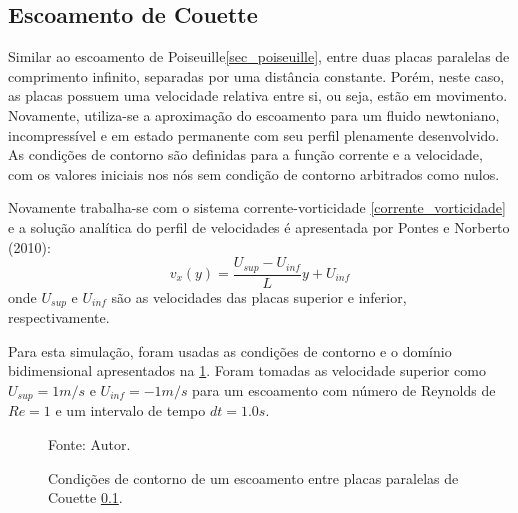 \subsection{\textbf{Escoamento de Couette}}
\label{sec_couette}
Similar ao escoamento de Poiseuille\ref{sec_poiseuille}, entre duas placas paralelas de comprimento infinito, separadas por uma distância constante.
Porém, neste caso, as placas possuem uma velocidade relativa entre si, ou seja, estão em movimento.
Novamente, utiliza-se a aproximação do escoamento para um fluido newtoniano, incompressível e em estado permanente com seu perfil plenamente desenvolvido.
As condições de contorno são definidas para a função corrente e a velocidade, com os valores iniciais nos nós sem condição de contorno arbitrados como nulos.

Novamente trabalha-se com o sistema corrente-vorticidade \ref{corrente_vorticidade} e a solução analítica do perfil de velocidades é apresentada por Pontes e Norberto (2010)\cite{pontes_norberto}:
\begin{equation}
    v_x(y) = \dfrac{U_{sup} - U_{inf}}{L}y + U_{inf}
    \label{couette_sol} 
\end{equation}
onde $U_{sup}$ e $U_{inf}$ são as velocidades das placas superior e inferior, respectivamente.

Para esta simulação, foram usadas as condições de contorno e o domínio bidimensional apresentados na \ref{couette_bc}.
Foram tomadas as velocidade superior como $U_{sup}=1m/s$ e $U_{inf}=-1m/s$ para um escoamento com número de Reynolds de $Re=1$ e um intervalo de tempo $dt=1.0s$.
\begin{figure}[H]
    \centering
     {\raggedleft \scriptsize Fonte: Autor.}
    \caption{Condições de contorno de um escoamento entre placas paralelas de Couette \ref{sec_couette}.}
    \label{couette_bc}
\end{figure}


